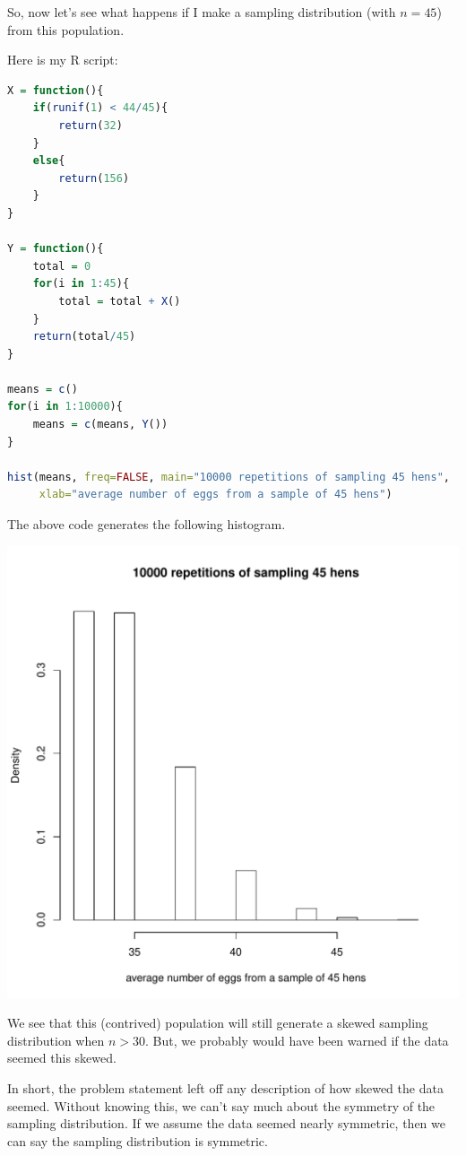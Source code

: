 \documentclass[12pt,letterpaper]{article}
\begin{document}
\begin{enumerate}
\begin{enumerate}
So, now let's see what happens if I make a sampling distribution (with $n=45$) from this population.

Here is my R script:
\begin{lstlisting}[language=r]
X = function(){
    if(runif(1) < 44/45){
        return(32)
    }
    else{
        return(156)
    }
}

Y = function(){
    total = 0
    for(i in 1:45){
        total = total + X()
    }
    return(total/45)
}

means = c()
for(i in 1:10000){
    means = c(means, Y())
}

hist(means, freq=FALSE, main="10000 repetitions of sampling 45 hens", 
     xlab="average number of eggs from a sample of 45 hens")
\end{lstlisting}

The above code generates the following histogram.

\begin{center}
\includegraphics[scale=0.8]{code/hens.pdf}
\end{center}

We see that this (contrived) population will still generate a skewed sampling distribution when $n>30$. But, we probably would have been warned if the data seemed this skewed.

In short, the problem statement left off any description of how skewed the data seemed. Without knowing this, we can't say much about the symmetry of the sampling distribution. If we assume the data seemed nearly symmetric, then we can say the sampling distribution is  symmetric.


\end{enumerate}
\end{enumerate}
\end{document}
